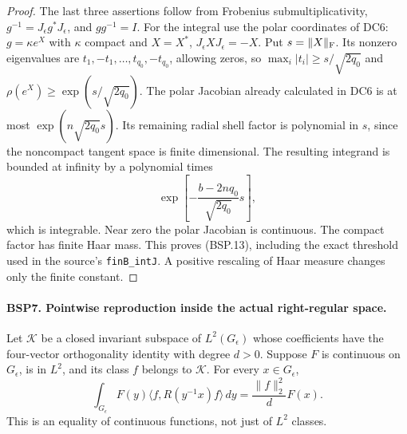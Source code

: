 \documentclass[11pt,a4paper]{article}
\numberwithin{equation}{section}
\theoremstyle{remark}\newtheorem{remark}[theorem]{Remark}
\begin{document}
\begin{proof}
The last three assertions follow from Frobenius submultiplicativity,
$g^{-1}=J_\epsilon g^*J_\epsilon$, and $gg^{-1}=I$.
For the integral use the polar coordinates of DC6:
$g=\kappa e^X$ with $\kappa$ compact and
$X=X^*$, $J_\epsilon XJ_\epsilon=-X$.
Put $s=\|X\|_{\rm F}$.  Its nonzero eigenvalues are
$t_1,-t_1,\ldots,t_{q_0},-t_{q_0}$, allowing zeros, so
$\max_i|t_i|\ge s/\sqrt{2q_0}$ and
$\rho(e^X)\ge\exp(s/\sqrt{2q_0})$.
The polar Jacobian already calculated in DC6 is at most
$\exp(n\sqrt{2q_0}s)$.
Its remaining radial shell factor is polynomial in $s$, since the
noncompact tangent space is finite dimensional.  The resulting
integrand is bounded at infinity by a polynomial times
\[
 \exp\left[-\frac{b-2nq_0}{\sqrt{2q_0}}s\right],
\]
which is integrable.  Near zero the polar Jacobian is continuous.
The compact factor has finite Haar mass.  This proves (BSP.13),
including the exact threshold used in the source's
\texttt{fin\allowbreak B\_\allowbreak int\allowbreak J}.  A positive rescaling of Haar measure changes only
the finite constant.
\end{proof}

\paragraph{BSP7. Pointwise reproduction inside the actual right-regular space.}
\label{claim:BSP7}
Let $\mathcal K$ be a closed invariant subspace of $L^2(G_\epsilon)$
whose coefficients have the four-vector orthogonality identity with
degree $d>0$.  Suppose $F$ is continuous on $G_\epsilon$, is in $L^2$,
and its class $f$ belongs to $\mathcal K$.
For every $x\in G_\epsilon$,
\[
 \int_{G_\epsilon}F(y)
        \langle f,R(y^{-1}x)f\rangle\,dy
           =\frac{\|f\|_2^2}{d}F(x).
 \tag{BSP.14}
\]
This is an equality of continuous functions, not just of $L^2$ classes.
\end{document}
